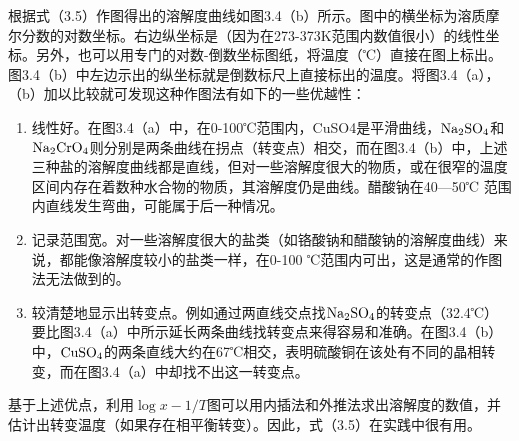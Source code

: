 根据式（3.5）作图得出的溶解度曲线如图3.4（b）所示。图中的横坐标为溶质摩尔分数的对数坐标。右边纵坐标是（因为在273-373K范围内数值很小）的线性坐标。另外，也可以用专门的对数-倒数坐标图纸，将温度（℃）直接在图上标出。图3.4（b）中左边示出的纵坐标就是倒数标尺上直接标出的温度。将图3.4（a），（b）加以比较就可发现这种作图法有如下的一些优越性：
\begin{enumerate}[(1)]
\item 线性好。在图3.4（a）中，在0-100℃范围内，CuSO4是平滑曲线，$\rm Na_2SO_4$和$\rm Na_2CrO_4$则分别是两条曲线在拐点（转变点）相交，而在图3.4（b）中，上述三种盐的溶解度曲线都是直线，但对一些溶解度很大的物质，或在很窄的温度区间内存在着数种水合物的物质，其溶解度仍是曲线。醋酸钠在40—50℃ 范围内直线发生弯曲，可能属于后一种情况。
\item 记录范围宽。对一些溶解度很大的盐类（如铬酸钠和醋酸钠的溶解度曲线）来说，都能像溶解度较小的盐类一样，在0-100 ℃范围内可出，这是通常的作图法无法做到的。
\item 较清楚地显示出转变点。例如通过两直线交点找$\rm Na_2SO_4$的转变点（32.4℃）要比图3.4（a）中所示延长两条曲线找转变点来得容易和准确。在图3.4（b）中，$\rm CuSO_4$的两条直线大约在67℃相交，表明硫酸铜在该处有不同的晶相转变，而在图3.4（a）中却找不出这一转变点。
\end{enumerate}

基于上述优点，利用$\log{x}-1/T$图可以用内插法和外推法求出溶解度的数值，并估计出转变温度（如果存在相平衡转变）。因此，式（3.5）在实践中很有用。
